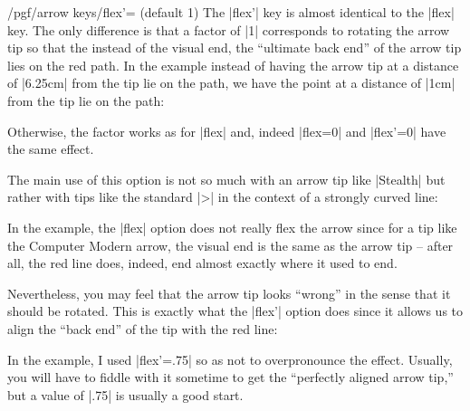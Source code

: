 \begin{key}{/pgf/arrow keys/flex'= (default 1)}
  The |flex'| key is almost identical to the |flex| key. The only
  difference is that a factor of |1| corresponds to rotating the arrow
  tip so that the instead of the visual end, the ``ultimate back end''
  of the arrow tip lies on the red path. In the example instead of
  having the arrow tip at a distance of |6.25cm| from the tip lie on
  the path, we have the point at a distance of |1cm| from the tip lie
  on the path:
\begin{codeexample}[]
\end{codeexample}
  Otherwise, the factor works as for |flex| and, indeed |flex=0| and
  |flex'=0| have the same effect.

  The main use of this option is not so much with an arrow tip like
  |Stealth| but rather with tips like the standard |>| in the context
  of a strongly curved line:
\begin{codeexample}[]
\end{codeexample}
  In the example, the |flex| option does not really flex the arrow
  since for a tip like the Computer Modern arrow, the visual end is
  the same as the arrow tip -- after all, the red line does, indeed, end
  almost exactly where it used to end.

  Nevertheless, you may feel that the arrow tip looks ``wrong'' in the sense that it
  should be rotated. This is exactly what the |flex'| option does
  since it allows us to align the ``back end'' of the tip with the red line:
\begin{codeexample}[]
\end{codeexample}
  In the example, I used |flex'=.75| so as not to overpronounce the
  effect. Usually, you will have to fiddle with it sometime to get the
  ``perfectly aligned arrow tip,'' but a value of |.75| is usually a
  good start.
\end{key}



